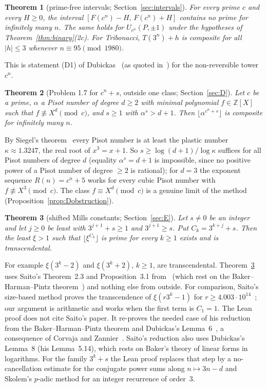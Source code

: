 \documentclass[11pt]{amsart}
\newtheorem{theorem}{Theorem}[section]
\theoremstyle{definition}
\newcommand{\Z}{\mathbb{Z}}
\newcommand{\floor}[1]{\lfloor #1 \rfloor}
\begin{document}
\begin{theorem}[prime-free intervals; Section~\ref{sec:intervals}]\label{thm:C}
For every prime $c$ and every $H\ge0$, the interval $[F(c^n)-H,\,F(c^n)+H]$ contains no prime for infinitely many $n$.  The same holds for $U_{c^n}(P,\pm1)$ under the hypotheses of Theorem~\ref{thm:binary}(2c).  For Tribonacci, $T(3^n)+h$ is composite for all $|h|\le3$ whenever $n\equiv95\pmod{1980}$.
\end{theorem}

This is statement (D1) of Dubickas~\cite{Dub18} (as quoted in~\cite{Sai25a}) for the non-reversible tower $c^n$.

\begin{theorem}[Problem 1.7 for $c^n+s$, outside one class; Section~\ref{sec:D}]\label{thm:D}
Let $c$ be a prime, $\alpha$ a Pisot number of degree $d\ge2$ with minimal polynomial $f\in\Z[X]$ such that $f\not\equiv X^d\pmod c$, and $s\ge1$ with $\alpha^s> d+1$.  Then $\floor{\alpha^{c^n+s}}$ is composite for infinitely many $n$.
\end{theorem}

By Siegel's theorem~\cite{Sie44} every Pisot number is at least the plastic number $\kappa\approx1.3247$, the real root of $x^3=x+1$.  So $s\ge\log(d+1)/\log\kappa$ suffices for all Pisot numbers of degree $d$ (equality $\alpha^s=d+1$ is impossible, since no positive power of a Pisot number of degree $\ge2$ is rational); for $d=3$ the exponent sequence $R(n)=c^n+5$ works for every cubic Pisot number with $f\not\equiv X^3\pmod c$.  The class $f\equiv X^d\pmod c$ is a genuine limit of the method (Proposition~\ref{prop:Dobstruction}).

\begin{theorem}[shifted Mills constants; Section~\ref{sec:E}]\label{thm:E}
Let $s\neq0$ be an integer and let $j\ge0$ be least with $3^{j+1}+s\ge1$ and $3^{j+1}\ge s$.  Put $C_k=3^{k+j}+s$.  Then the least $\xi>1$ such that $\floor{\xi^{C_k}}$ is prime for every $k\ge1$ exists and is transcendental.
\end{theorem}

For example $\xi(3^k-2)$ and $\xi(3^k+2)$, $k\ge1$, are transcendental.  Theorem~\ref{thm:E} uses Saito's Theorem~2.3 and Proposition~3.1 from~\cite{Sai25c} (which rest on the Baker--Harman--Pintz theorem~\cite{BHP01}) and nothing else from outside.  For comparison, Saito's size-based method proves the transcendence of $\xi(r3^k-1)$ for $r\ge4.003\cdot10^{14}$~\cite[Theorem~1.9(C)]{Sai25c}; our argument is arithmetic and works when the first term is $C_1=1$.  The Lean proof does not cite Saito's paper.  It re-proves the needed case of his reduction from the Baker--Harman--Pintz theorem and Dubickas's Lemma~6~\cite{Dub22}, a consequence of Corvaja and Zannier~\cite{CZ04}.  Saito's reduction also uses Dubickas's Lemma~8 (his Lemma~5.14), which rests on Baker's theory of linear forms in logarithms.  For the family $3^k+s$ the Lean proof replaces that step by a no-cancellation estimate for the conjugate power sums along $n\mapsto3n-d$ and Skolem's $p$-adic method for an integer recurrence of order~$3$.
\end{document}
